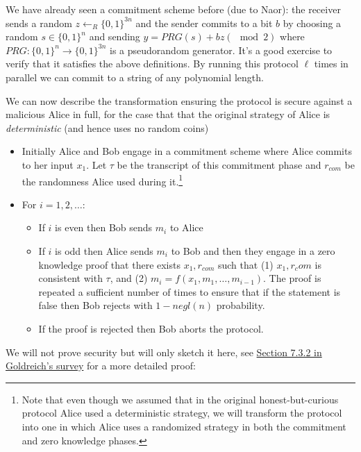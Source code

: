 We have already seen a commitment scheme before (due to Naor): the
receiver sends a random \(z\leftarrow_R\{0,1\}^{3n}\) and the sender
commits to a bit \(b\) by choosing a random \(s\in\{0,1\}^n\) and
sending \(y = \ensuremath{\mathit{PRG}}(s)+ bz (\mod 2)\) where
\(\ensuremath{\mathit{PRG}}:\{0,1\}^n\rightarrow\{0,1\}^{3n}\) is a
pseudorandom generator. It's a good exercise to verify that it satisfies
the above definitions. By running this protocol \(\ell\) times in
parallel we can commit to a string of any polynomial length.

We can now describe the transformation ensuring the protocol is secure
against a malicious Alice in full, for the case that that the original
strategy of Alice is \emph{deterministic} (and hence uses no random
coins)

\begin{itemize}
\item
  Initially Alice and Bob engage in a commitment scheme where Alice
  commits to her input \(x_1\). Let \(\tau\) be the transcript of this
  commitment phase and \(r_{com}\) be the randomness Alice used during
  it.\footnote{Note that even though we assumed that in the original
    honest-but-curious protocol Alice used a deterministic strategy, we
    will transform the protocol into one in which Alice uses a
    randomized strategy in both the commitment and zero knowledge
    phases.}
\item
  For \(i=1,2,\ldots\):

  \begin{itemize}
  \item
    If \(i\) is even then Bob sends \(m_i\) to Alice
  \item
    If \(i\) is odd then Alice sends \(m_i\) to Bob and then they engage
    in a zero knowledge proof that there exists \(x_1,r_{com}\) such
    that (1) \(x_1,r_com\) is consistent with \(\tau\), and (2)
    \(m_i = f(x_1,m_1,\ldots,m_{i-1})\). The proof is repeated a
    sufficient number of times to ensure that if the statement is false
    then Bob rejects with \(1-negl(n)\) probability.
  \item
    If the proof is rejected then Bob aborts the protocol.
  \end{itemize}
\end{itemize}

We will not prove security but will only sketch it here, see
\href{http://www.nowpublishers.com/article/Details/TCS-001}{Section
7.3.2 in Goldreich's survey} for a more detailed proof:

